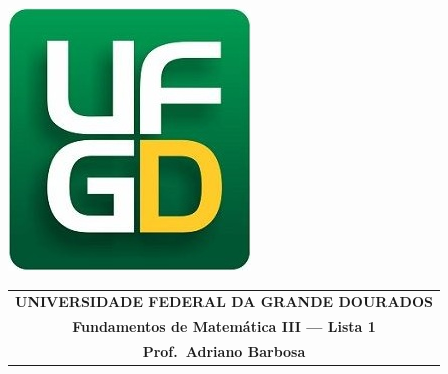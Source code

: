 \documentclass[a4paper,5pt]{amsbook}
\begin{document}
\thispagestyle{empty}
\pagestyle{empty}
\begin{minipage}[h]{0.14\textwidth}
	\includegraphics[scale=0.24]{../ufgd.png}
\end{minipage}
\begin{minipage}[h]{\textwidth}
\begin{tabular}{c}
{{\bf UNIVERSIDADE FEDERAL DA GRANDE DOURADOS}}\\
{{\bf Fundamentos de Matem\'{a}tica III --- Lista 1}}\\
{{\bf Prof.\ Adriano Barbosa}}\\
\end{tabular}
\vspace{-0.45cm}
%
\end{minipage}

\end{document}

